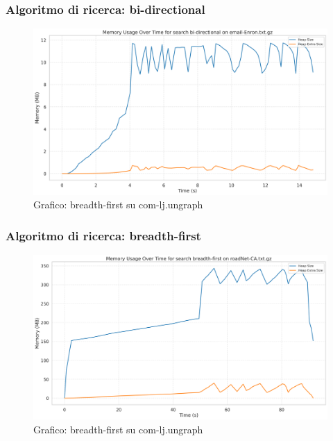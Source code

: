 \documentclass{article}
\begin{document}
\subsubsection{Algoritmo di ricerca: bi-directional}
\begin{figure}[h]\centering
\includegraphics[width=\textwidth]{../plots/email-Enron_bi-directional.png}
\caption{Grafico: breadth-first su com-lj.ungraph}
\end{figure}
\subsubsection{Algoritmo di ricerca: breadth-first}
\begin{figure}[h]\centering
\includegraphics[width=\textwidth]{../plots/roadNet-CA_breadth-first.png}
\caption{Grafico: breadth-first su com-lj.ungraph}
\end{figure}
\end{document}
